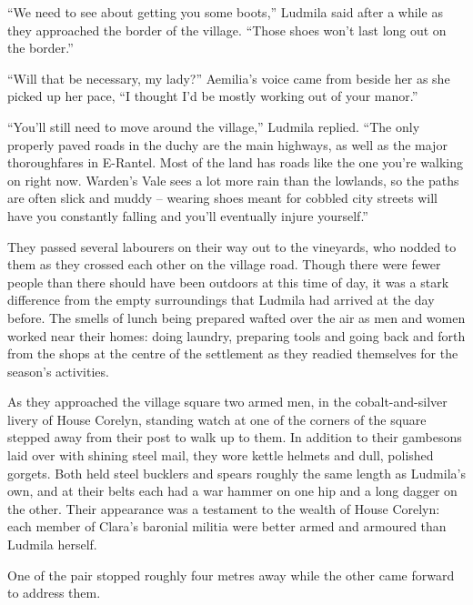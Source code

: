  

“We need to see about getting you some boots,” Ludmila said after a while as they approached the border of the village. “Those shoes won’t last long out on the border.”

 

“Will that be necessary, my lady?” Aemilia’s voice came from beside her as she picked up her pace, “I thought I’d be mostly working out of your manor.”

 

“You’ll still need to move around the village,” Ludmila replied. “The only properly paved roads in the duchy are the main highways, as well as the major thoroughfares in E-Rantel. Most of the land has roads like the one you’re walking on right now. Warden’s Vale sees a lot more rain than the lowlands, so the paths are often slick and muddy – wearing shoes meant for cobbled city streets will have you constantly falling and you’ll eventually injure yourself.”

 

They passed several labourers on their way out to the vineyards, who nodded to them as they crossed each other on the village road. Though there were fewer people than there should have been outdoors at this time of day, it was a stark difference from the empty surroundings that Ludmila had arrived at the day before. The smells of lunch being prepared wafted over the air as men and women worked near their homes: doing laundry, preparing tools and going back and forth from the shops at the centre of the settlement as they readied themselves for the season’s activities.

 

As they approached the village square two armed men, in the cobalt-and-silver livery of House Corelyn, standing watch at one of the corners of the square stepped away from their post to walk up to them. In addition to their gambesons laid over with shining steel mail, they wore kettle helmets and dull, polished gorgets. Both held steel bucklers and spears roughly the same length as Ludmila’s own, and at their belts each had a war hammer on one hip and a long dagger on the other. Their appearance was a testament to the wealth of House Corelyn: each member of Clara’s baronial militia were better armed and armoured than Ludmila herself.

 

One of the pair stopped roughly four metres away while the other came forward to address them.

 

